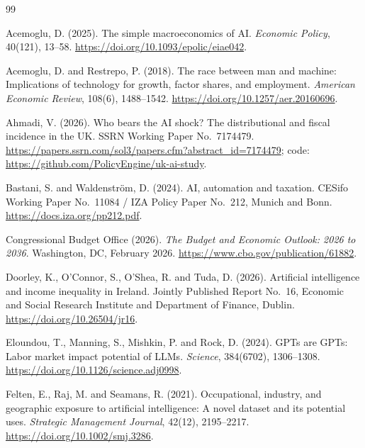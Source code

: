 \begin{thebibliography}{99}

Acemoglu, D. (2025).
\newblock The simple macroeconomics of AI.
\newblock \emph{Economic Policy}, 40(121), 13--58.
\newblock \url{https://doi.org/10.1093/epolic/eiae042}.

Acemoglu, D. and Restrepo, P. (2018).
\newblock The race between man and machine: Implications of technology for
growth, factor shares, and employment.
\newblock \emph{American Economic Review}, 108(6), 1488--1542.
\newblock \url{https://doi.org/10.1257/aer.20160696}.

Ahmadi, V. (2026).
\newblock Who bears the AI shock? The distributional and fiscal incidence in
the UK.
\newblock SSRN Working Paper No.~7174479.
\newblock \url{https://papers.ssrn.com/sol3/papers.cfm?abstract_id=7174479};
code: \url{https://github.com/PolicyEngine/uk-ai-study}.

Bastani, S. and Waldenstr\"{o}m, D. (2024).
\newblock AI, automation and taxation.
\newblock CESifo Working Paper No.~11084 / IZA Policy Paper No.~212, Munich
and Bonn.
\newblock \url{https://docs.iza.org/pp212.pdf}.

Congressional Budget Office (2026).
\newblock \emph{The Budget and Economic Outlook: 2026 to 2036}.
\newblock Washington, DC, February 2026.
\newblock \url{https://www.cbo.gov/publication/61882}.

Doorley, K., O'Connor, S., O'Shea, R. and Tuda, D. (2026).
\newblock Artificial intelligence and income inequality in Ireland.
\newblock Jointly Published Report No.~16, Economic and Social Research
Institute and Department of Finance, Dublin.
\newblock \url{https://doi.org/10.26504/jr16}.

Eloundou, T., Manning, S., Mishkin, P. and Rock, D. (2024).
\newblock GPTs are GPTs: Labor market impact potential of LLMs.
\newblock \emph{Science}, 384(6702), 1306--1308.
\newblock \url{https://doi.org/10.1126/science.adj0998}.

Felten, E., Raj, M. and Seamans, R. (2021).
\newblock Occupational, industry, and geographic exposure to artificial
intelligence: A novel dataset and its potential uses.
\newblock \emph{Strategic Management Journal}, 42(12), 2195--2217.
\newblock \url{https://doi.org/10.1002/smj.3286}.


\end{thebibliography}
